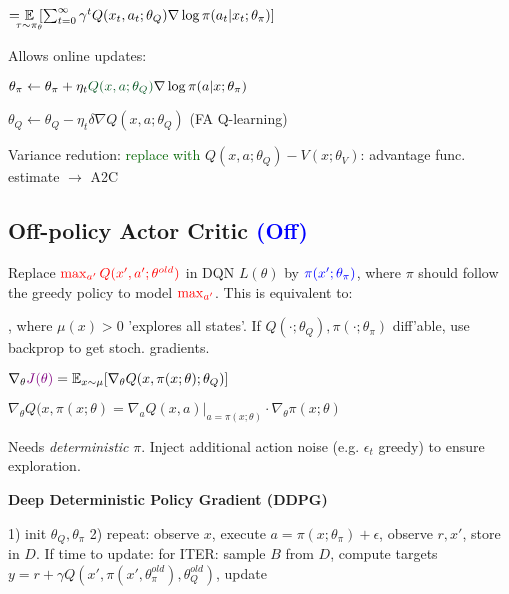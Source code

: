 $= \hspace*{-2mm} \underset{\tau \sim \pi_\theta}{\mathbb{E}} \hspace*{-1mm} [\sum_{t=0}^\infty \gamma^t Q(x_t, a_t; \theta_Q) \nabla \log \pi(a_t | x_t; \theta_\pi)]$



Allows online updates:

$\theta_\pi \leftarrow \theta_\pi + \eta_t \textcolor{darkgreen}{Q(x,a;\theta_Q)} \nabla \log \pi(a | x; \theta_\pi)$

$\theta_Q \leftarrow \theta_Q  - \eta_t \delta \nabla Q(x,a;\theta_Q)$ (FA Q-learning)

Variance redution: \textcolor{darkgreen}{replace with} $Q(x,a;\theta_Q) - V(x; \theta_V)$: advantage func. estimate $\rightarrow$ A2C

\subsection*{Off-policy Actor Critic \textcolor{blue}{\textnormal{(Off)}}}

Replace $\textcolor{red}{\max_{a'} Q(x', a'; \theta^{old})}$ in DQN $L(\theta)$ by $\textcolor{blue}{\pi(x'; \theta_\pi)}$, where $\pi$ should follow the greedy policy to model $\textcolor{red}{\max_{a'}}$. This is equivalent to:

,
where $\mu(x) > 0$ 'explores all states'. If $Q(\cdot; \theta_Q), \pi(\cdot; \theta_\pi)$ diff'able, use backprop to get stoch. gradients.

$\nabla_\theta \textcolor{violet}{J(\theta)} = \mathbb{E}_{x \sim \mu} [\nabla_\theta Q(x,\pi(x;\theta); \theta_Q)]$

$\nabla_{\theta} Q(x,\pi(x;\theta) = \nabla_a Q(x,a)|_{a = \pi(x;\theta)} \cdot \nabla_{\theta} \pi(x; \theta)$

Needs \textit{deterministic} $\pi$. Inject additional action noise (e.g. $\epsilon_t$ greedy) to ensure exploration.

{\fontsize{9.5}{6}\selectfont \textbf{Deep Deterministic Policy Gradient (DDPG)}}

1) init $\theta_Q, \theta_\pi$ 2) repeat: observe $x$, execute $a = \pi(x; \theta_\pi) + \epsilon$, observe $r,x'$, store in $D$. If time to update: for ITER: sample $B$ from $D$, compute targets
$y = r+ \gamma Q(x', \pi(x', \theta_\pi^{old}), \theta_Q^{old})$, update
\iffalse
do GD ($\theta_Q$)/ GA ($\theta_\pi$), update $\theta^{old} \leftarrow (1 - \rho) \theta^{old} + \rho \theta$
\fi


